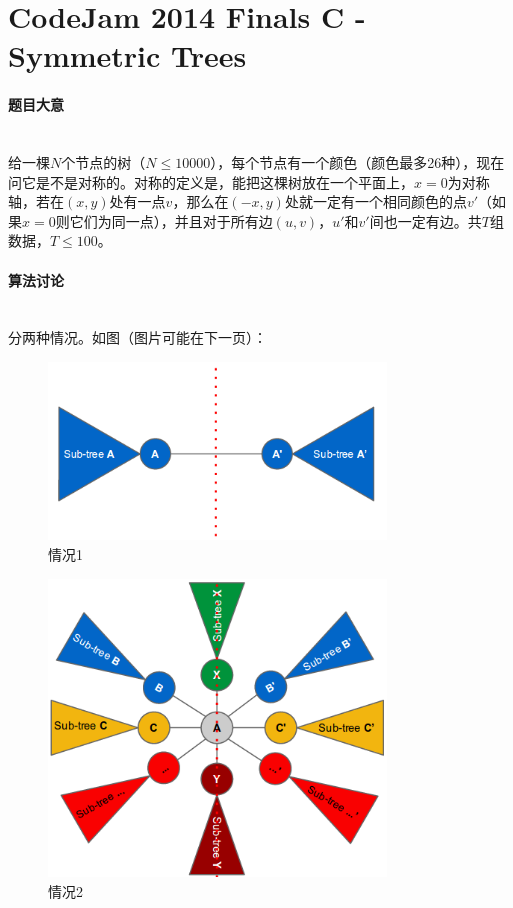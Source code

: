 \documentclass[UTF8]{ctexart}
\newcommand{\myparagraph}[1]{\paragraph{#1}\mbox{}\\}
\theoremstyle{nonumberplain}
\begin{document}
	\section{CodeJam 2014 Finals C - Symmetric Trees}
	
		\myparagraph{题目大意}
	
			给一棵$N$个节点的树（$N \leq 10000$），每个节点有一个颜色（颜色最多26种），现在问它是不是对称的。对称的定义是，能把这棵树放在一个平面上，$x=0$为对称轴，若在$(x,y)$处有一点$v$，那么在$(-x,y)$处就一定有一个相同颜色的点$v'$（如果$x=0$则它们为同一点），并且对于所有边$(u,v)$，$u'$和$v'$间也一定有边。共$T$组数据，$T \leq 100$。
	
		\myparagraph{算法讨论}
		
			分两种情况。如图（图片可能在下一页）：
			
			\begin{figure}[ht]
				\centering
				\includegraphics[width=0.8\textwidth]{figgcj2014c_1.png}
				\caption{情况1}
			\end{figure}
			
			\begin{figure}[ht]
				\centering
				\includegraphics[width=0.8\textwidth]{figgcj2014c_2.png}
				\caption{情况2}
			\end{figure}
		
\end{document}
